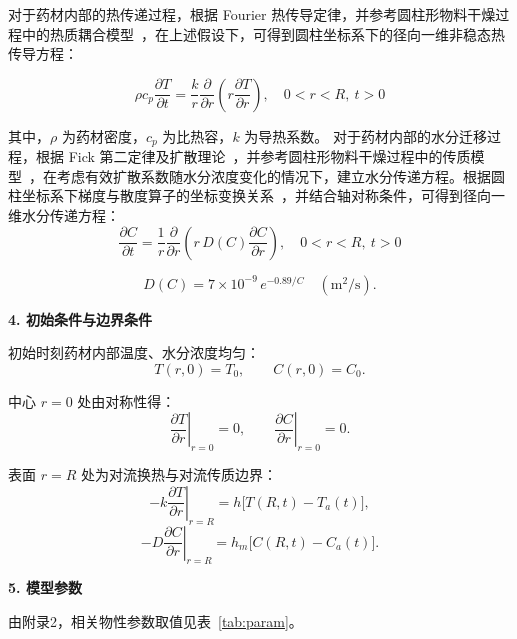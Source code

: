 \documentclass[12pt,a4paper]{ctexart}
\begin{document}
对于药材内部的热传递过程，根据 Fourier 热传导定律，并参考圆柱形物料干燥过程中的热质耦合模型~\cite{ref1}，在上述假设下，可得到圆柱坐标系下的径向一维非稳态热传导方程：

\begin{equation}
\rho c_p\frac{\partial T}{\partial t}
=\frac{k}{r}\frac{\partial}{\partial r}\left(r\frac{\partial T}{\partial r}\right),
\quad 0<r<R,\ t>0
\label{eq:heat}
\end{equation}

其中，$\rho$ 为药材密度，$c_p$ 为比热容，$k$ 为导热系数。
对于药材内部的水分迁移过程，根据 Fick 第二定律及扩散理论~\cite{ref3}，并参考圆柱形物料干燥过程中的传质模型~\cite{ref1}，在考虑有效扩散系数随水分浓度变化的情况下，建立水分传递方程。根据圆柱坐标系下梯度与散度算子的坐标变换关系~\cite{ref2}，并结合轴对称条件，可得到径向一维水分传递方程：
\begin{equation}
\frac{\partial C}{\partial t}
=\frac{1}{r}\frac{\partial}{\partial r}\left(r\,D(C)\frac{\partial C}{\partial r}\right),
\quad 0<r<R,\ t>0
\label{eq:mass}
\end{equation}

\begin{equation}
D(C)=7\times10^{-9}\,e^{-0.89/C}\quad(\mathrm{m^2/s}).
\label{eq:D}
\end{equation}

\textbf{4. 初始条件与边界条件}

初始时刻药材内部温度、水分浓度均匀：
\begin{equation}
T(r,0)=T_0,\qquad C(r,0)=C_0.
\label{eq:ic}
\end{equation}

中心 $r=0$ 处由对称性得：
\begin{equation}
\left.\frac{\partial T}{\partial r}\right|_{r=0}=0,\qquad
\left.\frac{\partial C}{\partial r}\right|_{r=0}=0.
\label{eq:bc_center}
\end{equation}

表面 $r=R$ 处为对流换热与对流传质边界：
\begin{equation}
-k\left.\frac{\partial T}{\partial r}\right|_{r=R}=h\bigl[T(R,t)-T_a(t)\bigr],
\label{eq:bc_heat}
\end{equation}
\begin{equation}
-D\left.\frac{\partial C}{\partial r}\right|_{r=R}=h_m\bigl[C(R,t)-C_a(t)\bigr].
\label{eq:bc_mass}
\end{equation}

\textbf{5. 模型参数}

由附录2，相关物性参数取值见表~\ref{tab:param}。
\end{document}
